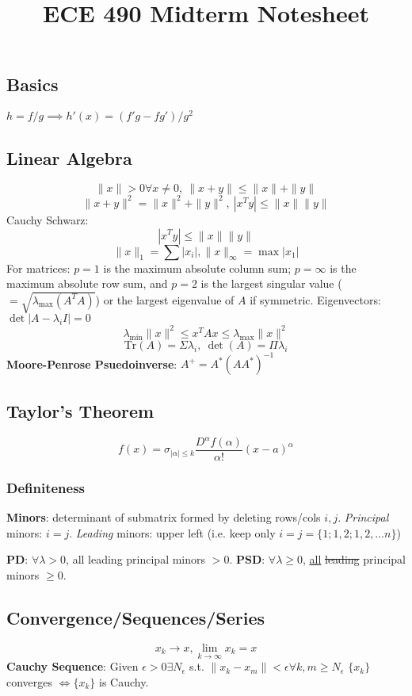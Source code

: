 \documentclass[10pt,landscape]{article}
\title{ECE 490 Midterm Notesheet}
\begin{document}


\begin{multicols*}{\mycolnums}
    \section*{Basics}
    $h=f/g\implies h'(x)=(f'g-fg')/g^2$
    \subsection*{Linear Algebra}
    \[\|x\|>0\forall x\neq0,\ \|x+y\|\leq\|x\|+\|y\|\]
    \[\|x+y\|^2=\|x\|^2+\|y\|^2,\ |x^Ty|\leq\|x\|\|y\|\]
    Cauchy Schwarz:
    \[|x^Ty|\leq\|x\|\|y\|\]
    \[\|x\|_1=\sum|x_i|, \|x\|_\infty=\max|x_1|\]
    For matrices: $p=1$ is the maximum absolute column sum; $p=\infty$ is the
    maximum absolute row sum, and $p=2$ is the largest singular value ($=\sqrt{\lambda_{\max}(A^TA)}$)
    or the largest eigenvalue of $A$ if symmetric.
    Eigenvectors: $\det|A-\lambda_iI| = 0$
    \[\lambda_{\min}\|x\|^2 \leq x^TAx\leq \lambda_{\max}\|x\|^2\]
    \[\mathrm{Tr}(A)=\Sigma\lambda_i,\ \det(A)=\Pi\lambda_i\]
    \textbf{Moore-Penrose Psuedoinverse}:
    $A^+=A^*(AA^*)^{-1}$
    \subsection*{Taylor's Theorem}
    \[f(x) = \sigma_{|\alpha|\leq k}\frac{D^\alpha f(\alpha)}{\alpha!}(x-a)^\alpha\]
    \subsubsection*{Definiteness}
    \textbf{Minors}: determinant of submatrix formed by deleting rows/cols $i,j$. \textit{Principal}
    minors: $i=j$. \textit{Leading} minors: upper left (i.e. keep only $i=j=\{1;1,2;1,2,\ldots n\}$)

    \noindent
    \textbf{PD}: $\forall\lambda>0$, all leading principal minors $>0$.
    \noindent
    \textbf{PSD}: $\forall\lambda\geq0$, \uline{all} \sout{leading} principal minors $\geq0$.
    \subsection*{Convergence/Sequences/Series}
    \[x_k\rightarrow x,\lim_{k\rightarrow\infty}x_k=x\]
    \textbf{Cauchy Sequence}: Given $\epsilon>0\exists N_{\epsilon}$ s.t. $\|x_k-x_m\|<\epsilon\forall k,m\geq N_\epsilon$
    $\{x_k\}$ converges $\iff \{x_k\}$ is Cauchy.


\end{multicols*}
\end{document}
